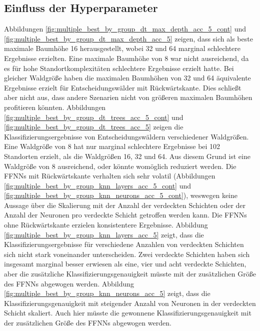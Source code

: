\subsection{Einfluss der Hyperparameter}
Abbildungen \ref{fig:multiple_best_by_group_dt_max_depth_acc_5_cont} und \ref{fig:multiple_best_by_group_dt_max_depth_acc_5} zeigen, dass sich
als beste maximale Baumhöhe 16 herausgestellt, wobei 32 und 64 marginal schlechtere Ergebnisse erzielten.
Eine maximale Baumhöhe von 8 war nicht ausreichend, da es für hohe Standortkomplexitäten schlechtere Ergebnisse erzielt hatte.
Bei gleicher Waldgröße haben die maximalen Baumhöhen von 32 und 64 äquivalente Ergebnisse erzielt für Entscheidungswälder mit Rückwärtskante.
\newline
\newline
Dies schließt aber nicht aus, dass andere Szenarien nicht von größeren maximalen Baumhöhen profitieren könnten.
Abbildungen \ref{fig:multiple_best_by_group_dt_trees_acc_5_cont} und \ref{fig:multiple_best_by_group_dt_trees_acc_5} zeigen
die Klassifizierungsergebnisse von Entscheidungswäldern verschiedener Waldgrößen.
Eine Waldgröße von 8 hat nur marginal schlechtere Ergebnisse bei 102 Standorten erzielt, als die Waldgrößen 16, 32 und 64.
Aus diesem Grund ist eine Waldgröße von 8 ausreichend, oder könnte womöglich reduziert werden.
\newline
\newline
Die FFNNs mit Rückwärtskante verhalten sich sehr volatil (Abbildungen \ref{fig:multiple_best_by_group_knn_layers_acc_5_cont}
und \ref{fig:multiple_best_by_group_knn_neurons_acc_5_cont}), weswegen keine Aussage über die Skalierung mit der
Anzahl der verdeckten Schichten oder der Anzahl der Neuronen pro verdeckte Schicht getroffen werden kann.
Die FFNNs ohne Rückwärtskante erzielen konsistentere Ergebnisse.
Abbildung \ref{fig:multiple_best_by_group_knn_layers_acc_5} zeigt, dass die Klassifizierungsergebnisse
für verschiedene Anzahlen von verdeckten Schichten sich nicht stark voneinander unterscheiden.
Zwei verdeckte Schichten haben sich insgesamt marginal besser erwiesen als eine, vier und acht verdeckte Schichten,
aber die zusätzliche Klassifizierungsgenauigkeit müsste mit der zusätzlichen Größe des FFNNs abgewogen werden.
Abbildung \ref{fig:multiple_best_by_group_knn_neurons_acc_5} zeigt, dass die Klassifizierungsgenauigkeit
mit steigender Anzahl von Neuronen in der verdeckten Schicht skaliert.
Auch hier müsste die gewonnene Klassifizierungsgenauigkeit mit der zusätzlichen Größe des FFNNs abgewogen werden.
